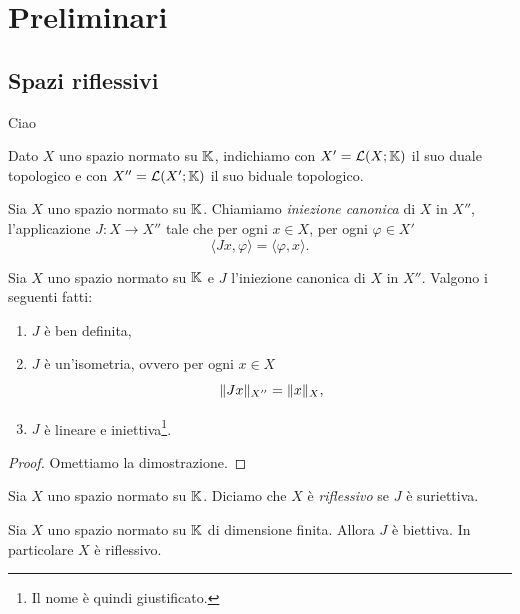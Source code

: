


\chapter*{Preliminari}
\section{Spazi riflessivi}
Ciao
\begin{notazione}
	Dato $X$ uno spazio normato su $\mathbb{K}$, indichiamo con $X' = \mathcal{L}(X;\mathbb{K})$ il suo duale topologico e con $X'' = \mathcal{L}(X';\mathbb{K})$ il suo biduale topologico.
\end{notazione}
\begin{definizione}
	Sia $X$ uno spazio normato su $\mathbb{K}$. Chiamiamo \emph{iniezione canonica} di $X$ in $X''$, l'applicazione $J: X \to X''$ tale che per ogni $x \in X$, per ogni $\varphi \in X'$
	\[ \langle Jx,\varphi\rangle = \langle\varphi, x\rangle. \]
\end{definizione}
\begin{proposizione}
	Sia $X$ uno spazio normato su $\mathbb{K}$ e $J$ l'iniezione canonica di $X$ in $X''$. Valgono i seguenti fatti:
	\begin{enumerate}[$(a)$]
		\item $J$ è ben definita,
		\item $J$ è un'isometria, ovvero per ogni $x \in X$
		\[ \lVert Jx\rVert_{X''} = \lVert x\rVert_{X}, \]
		\item $J$ è lineare e iniettiva\footnote{Il nome è quindi giustificato.}.
	\end{enumerate}
\end{proposizione}
\begin{proof}
	Omettiamo la dimostrazione.
\end{proof}
\begin{definizione}
	Sia $X$ uno spazio normato su $\mathbb{K}$. Diciamo che $X$ è \emph{riflessivo} se $J$ è suriettiva.
\end{definizione}
\begin{proposizione}
	Sia $X$ uno spazio normato su $\mathbb{K}$ di dimensione finita. Allora $J$ è biettiva. In particolare $X$ è riflessivo.
\end{proposizione}
